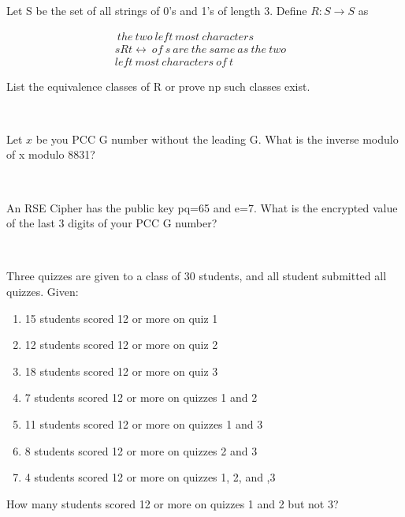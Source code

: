 \documentclass[10pt,letterpaper, cm]{hmcpset}
\begin{document}
\begin{problem}[7]
  Let S be the set of all strings of 0's and 1's of length 3. Define $ R:S \rightarrow S$ as\\ 
  \begin{center}
    \begin{align*}
      ~the~two~left~most~characters& \\
      sRt \leftrightarrow~
      of~s~are~the~same~as~the~two\\
      left~most~characters~of~t 
    \end{align*}
  \end{center}
  List the equivalence classes of R or prove np such classes exist.
\end{problem}\\

\begin{problem}[8]
  Let $x$ be you PCC G number without the leading G. What is the inverse modulo of
  x modulo 8831?
\end{problem}\\

\begin{problem}[9]
  An RSE Cipher has the public key pq=65 and e=7. What is the encrypted value of the
  last 3 digits of your PCC G number?
\end{problem}\\

\begin{problem}[10]
  Three quizzes are given to a class of 30 students, and all student submitted all quizzes.
  Given:\\
  \begin{enumerate}[-]
    \item 15 students scored 12 or more on quiz 1
    \item 12 students scored 12 or more on quiz 2
    \item 18 students scored 12 or more on quiz 3
    \item 7 students scored 12 or more on quizzes 1 and 2
    \item 11 students scored 12 or more on quizzes 1 and 3
    \item 8 students scored 12 or more on quizzes 2 and 3
    \item 4 students scored 12 or more on quizzes 1, 2, and ,3
  \end{enumerate}
  How many students scored 12 or more on quizzes 1 and 2 but not 3?
\end{problem}\\
\end{document}
